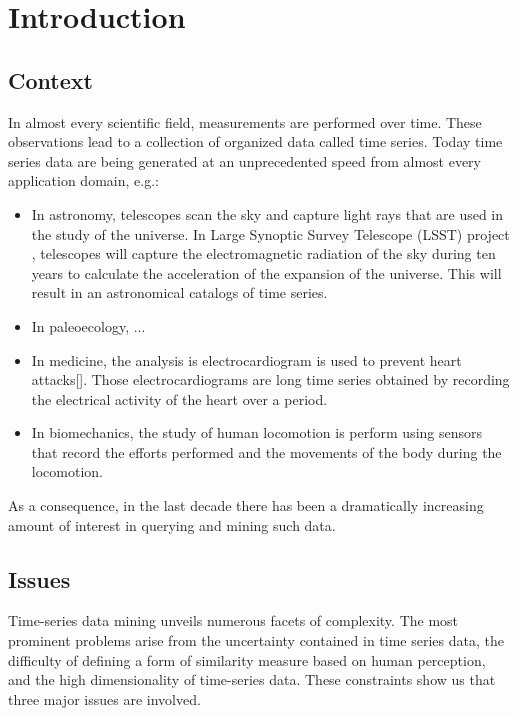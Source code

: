 \chapter*{Introduction}

\section*{Context}

In almost every scientific field, measurements are performed over time. These observations lead to a collection
of organized data called time series. Today time series data are being generated at an unprecedented
speed from almost every application domain, e.g.: 

\begin{itemize}
\item In astronomy, telescopes scan the sky and capture light rays that are used in the study of the universe. In Large Synoptic Survey Telescope (LSST) project \cite{lsst}, telescopes will capture the electromagnetic radiation of the sky during ten years to calculate the acceleration of the expansion of the universe. This will result in an astronomical catalogs of time series.
\item In paleoecology, ...
\item In medicine, the analysis is electrocardiogram is used to prevent heart attacks[]. Those electrocardiograms are long time series obtained by recording the electrical activity of the heart over a period.  
\item In biomechanics, the study of human locomotion is perform using sensors that record the efforts performed and the movements of the body during the locomotion.
\end{itemize}

As a consequence, in the last decade there has been a dramatically increasing amount of interest in querying and mining such data.

\section*{Issues}



Time-series data mining unveils numerous facets of complexity. The most prominent
problems arise from the uncertainty contained in time series data,  the difficulty of
defining a form of similarity measure based on human perception, and the high dimensionality of time-series data. These constraints show us that three major issues are involved.


